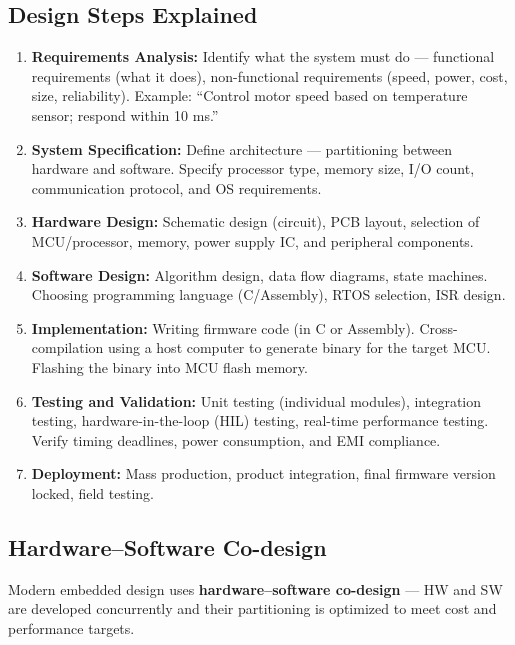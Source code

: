 \documentclass[12pt,a4paper]{article}
\begin{document}
\subsection{Design Steps Explained}

\begin{enumerate}[label=\textbf{\arabic*.}, leftmargin=*, itemsep=4pt]
  \item \textbf{Requirements Analysis:} Identify what the system must do --- functional requirements (what it does), non-functional requirements (speed, power, cost, size, reliability). Example: ``Control motor speed based on temperature sensor; respond within 10 ms.''
  \item \textbf{System Specification:} Define architecture --- partitioning between hardware and software. Specify processor type, memory size, I/O count, communication protocol, and OS requirements.
  \item \textbf{Hardware Design:} Schematic design (circuit), PCB layout, selection of MCU/processor, memory, power supply IC, and peripheral components.
  \item \textbf{Software Design:} Algorithm design, data flow diagrams, state machines. Choosing programming language (C/Assembly), RTOS selection, ISR design.
  \item \textbf{Implementation:} Writing firmware code (in C or Assembly). Cross-compilation using a host computer to generate binary for the target MCU. Flashing the binary into MCU flash memory.
  \item \textbf{Testing and Validation:} Unit testing (individual modules), integration testing, hardware-in-the-loop (HIL) testing, real-time performance testing. Verify timing deadlines, power consumption, and EMI compliance.
  \item \textbf{Deployment:} Mass production, product integration, final firmware version locked, field testing.
\end{enumerate}

\subsection{Hardware--Software Co-design}

Modern embedded design uses \textbf{hardware--software co-design} --- HW and SW are developed concurrently and their partitioning is optimized to meet cost and performance targets.
\end{document}
